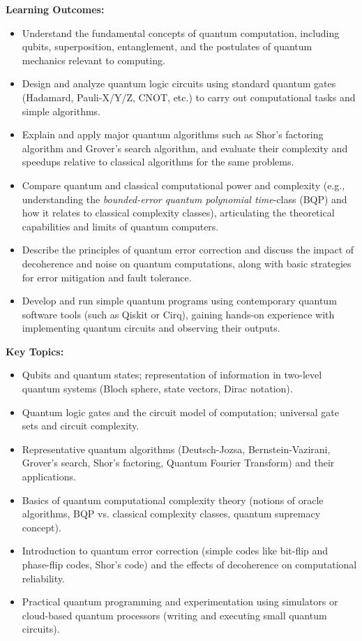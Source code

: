\documentclass{scrreprt}
\begin{document}
\textbf{Learning Outcomes:}
\begin{itemize}
\item Understand the fundamental concepts of quantum computation, including qubits, superposition, entanglement, and the postulates of quantum mechanics relevant to computing.
\item Design and analyze quantum logic circuits using standard quantum gates (Hadamard, Pauli-X/Y/Z, CNOT, etc.) to carry out computational tasks and simple algorithms.
\item Explain and apply major quantum algorithms such as Shor’s factoring algorithm and Grover’s search algorithm, and evaluate their complexity and speedups relative to classical algorithms for the same problems.
\item Compare quantum and classical computational power and complexity (e.g., understanding the \textit{bounded-error quantum polynomial time}-class (BQP) and how it relates to classical complexity classes), articulating the theoretical capabilities and limits of quantum computers.
\item Describe the principles of quantum error correction and discuss the impact of decoherence and noise on quantum computations, along with basic strategies for error mitigation and fault tolerance.
\item Develop and run simple quantum programs using contemporary quantum software tools (such as Qiskit or Cirq), gaining hands-on experience with implementing quantum circuits and observing their outputs.
\end{itemize}

\textbf{Key Topics:}
\begin{itemize}
\item Qubits and quantum states; representation of information in two-level quantum systems (Bloch sphere, state vectors, Dirac notation).
\item Quantum logic gates and the circuit model of computation; universal gate sets and circuit complexity.
\item Representative quantum algorithms (Deutsch-Jozsa, Bernstein-Vazirani, Grover’s search, Shor’s factoring, Quantum Fourier Transform) and their applications.
\item Basics of quantum computational complexity theory (notions of oracle algorithms, BQP vs. classical complexity classes, quantum supremacy concept).
\item Introduction to quantum error correction (simple codes like bit-flip and phase-flip codes, Shor’s code) and the effects of decoherence on computational reliability.
\item Practical quantum programming and experimentation using simulators or cloud-based quantum processors (writing and executing small quantum circuits).
\end{itemize}
\end{document}
